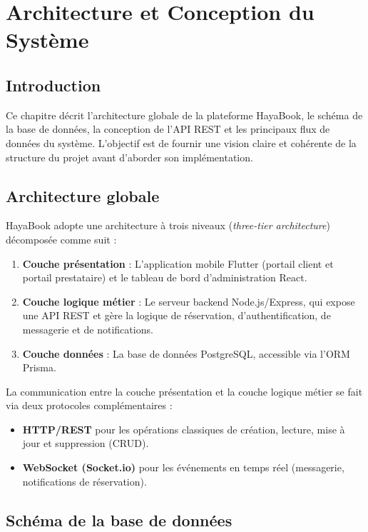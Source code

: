 \chapter{Architecture et Conception du Système}

\section{Introduction}

Ce chapitre décrit l'architecture globale de la plateforme HayaBook, le schéma de la base de données, la conception de l'API REST et les principaux flux de données du système. L'objectif est de fournir une vision claire et cohérente de la structure du projet avant d'aborder son implémentation.

\section{Architecture globale}

HayaBook adopte une architecture à trois niveaux (\textit{three-tier architecture}) décomposée comme suit :

\begin{enumerate}
    \item \textbf{Couche présentation} : L'application mobile Flutter (portail client et portail prestataire) et le tableau de bord d'administration React.
    \item \textbf{Couche logique métier} : Le serveur backend Node.js/Express, qui expose une API REST et gère la logique de réservation, d'authentification, de messagerie et de notifications.
    \item \textbf{Couche données} : La base de données PostgreSQL, accessible via l'ORM Prisma.
\end{enumerate}

La communication entre la couche présentation et la couche logique métier se fait via deux protocoles complémentaires :
\begin{itemize}
    \item \textbf{HTTP/REST} pour les opérations classiques de création, lecture, mise à jour et suppression (CRUD).
    \item \textbf{WebSocket (Socket.io)} pour les événements en temps réel (messagerie, notifications de réservation).
\end{itemize}

\section{Schéma de la base de données}

